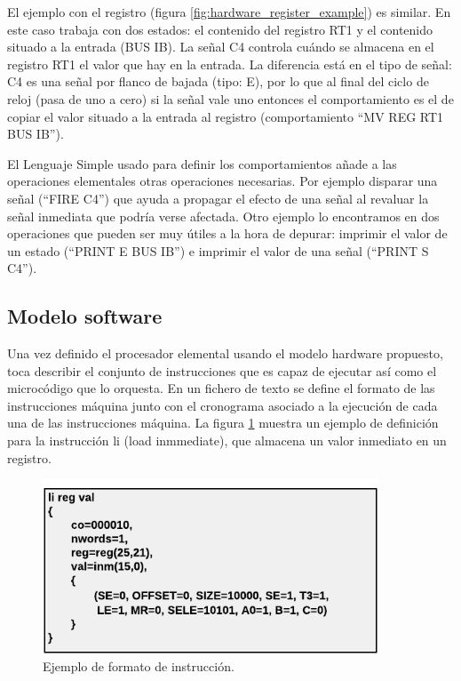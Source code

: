 El ejemplo con el registro (figura \ref{fig:hardware_register_example}) es similar. En este caso trabaja con dos estados: el contenido del registro RT1 y el contenido situado a la entrada (BUS IB). La señal C4 controla cuándo se almacena en el registro RT1 el valor que hay en la entrada. La diferencia está en el tipo de señal: C4 es una señal por flanco de bajada (tipo: E), por lo que al final del ciclo de reloj (pasa de uno a cero) si la señal vale uno entonces el comportamiento es el de copiar el valor situado a la entrada al registro (comportamiento ``MV REG RT1 BUS IB'').

El Lenguaje Simple usado para definir los comportamientos añade a las operaciones elementales otras operaciones necesarias. Por ejemplo disparar una señal (``FIRE C4'') que ayuda a propagar el efecto de una señal al revaluar la señal inmediata que podría verse afectada. Otro ejemplo lo encontramos en dos operaciones que pueden ser muy útiles a la hora de depurar: imprimir el valor de un estado (``PRINT E BUS IB'') e imprimir el valor de una señal (``PRINT S C4'').

\subsection{Modelo software}

Una vez definido el procesador elemental usando el modelo hardware propuesto, toca describir el conjunto de instrucciones que es capaz de ejecutar así como el microcódigo que lo orquesta. En un fichero de texto se define el formato de las instrucciones máquina junto con el cronograma asociado a la ejecución de cada una de las instrucciones máquina. La figura \ref{fig:software_format_example} muestra un ejemplo de definición para la instrucción li (load inmmediate), que almacena un valor inmediato en un registro.

\begin{figure}[htbp]
 	\centering
 	\includegraphics[width=10cm]{figures/instruction_example}
 	\caption{Ejemplo de formato de instrucción.}
	\label{fig:software_format_example}
\end{figure}

